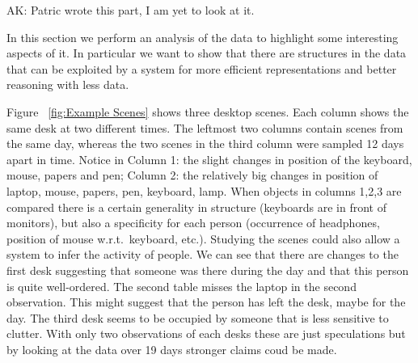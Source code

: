 \documentclass[letterpaper, 10 pt, conference]{ieeeconf}  %
\begin{document}
{\color{blue} AK: Patric wrote this part, I am yet to look at it.}

In this section we perform an analysis of the data to highlight some interesting aspects of it. In particular we want to show that 
there are structures in the data that can be exploited by a system for more efficient representations and better reasoning with less data.

Figure ~\ref{fig:Example Scenes} shows three desktop scenes. Each column shows the same desk at two different times. The leftmost two columns 
contain scenes from the same day, whereas the two scenes in the third column were sampled 12 days apart in time. Notice in Column 1: the slight changes in 
position of the keyboard, mouse, papers and pen; Column 2: the relatively big changes in position of laptop, mouse, papers, pen, keyboard, 
lamp. When objects in columns 1,2,3 are compared there is a certain generality in structure (keyboards are in front of monitors), but 
also a specificity for each person (occurrence of headphones, position of mouse w.r.t.\ keyboard, etc.). Studying the scenes could also allow a system to 
infer the activity of people. We can see that there are changes to the first desk suggesting that someone 
was there during the day and that this person is quite well-ordered. The second table misses the laptop in the second observation. This might suggest that 
the person has left the desk, maybe for the day. The third desk seems to be occupied by someone that is less sensitive to 
clutter. With only two observations of each desks these are just speculations but by looking at the data over 19 days stronger claims coud be made.
\end{document}
